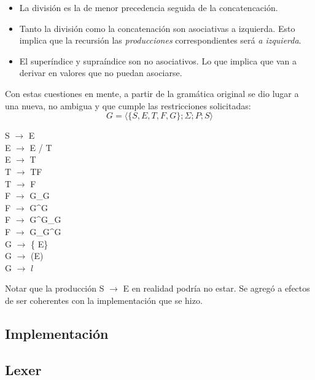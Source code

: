 \begin{itemize}
 \item La división es la de menor precedencia seguida de la concatencación.
  \item Tanto la división como la concatenación son asociativas a izquierda. Esto implica que la recursión las \textit{producciones} correspondientes será \textit{a izquierda}.
  \item El superíndice y supraíndice son no asociativos. Lo que implica que van a derivar en valores que no puedan asociarse.
\end{itemize}

\indent Con estas cuestiones en mente, a partir de la gramática original se dio lugar a una nueva, no ambigua y que cumple las restricciones solicitadas:\\

\begin{equation}
    G = \langle \{ S, E, T, F, G\};\Sigma;P;S \rangle
 \end{equation}

\begin{center}
 S $\rightarrow$ E
\\ E $\rightarrow$ E / T
\\ E $\rightarrow$ T
\\ T $\rightarrow$ TF
\\ T $\rightarrow$ F
\\ F $\rightarrow$ G\_G
\\ F $\rightarrow$ G\textasciicircum G
\\ F $\rightarrow$ G\textasciicircum G\_G
\\ F $\rightarrow$ G\_G\textasciicircum G
\\ G $\rightarrow$ \{ E\}
\\ G $\rightarrow$ (E)
\\ G $\rightarrow$ $l$
\end{center}

\indent Notar que la producción  S $\rightarrow$ E en realidad podría no estar. Se agregó a efectos de ser coherentes con la implementación que se hizo.\\ 

\subsection{Implementación}

\subsection{Lexer}

